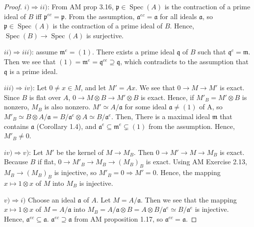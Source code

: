 \documentclass[12pt,letterpaper]{article}
\theoremstyle{definition}
\theoremstyle{remark}
\numberwithin{figure}{problem}
\numberwithin{equation}{section}
\DeclareMathOperator{\Spec}{Spec}
\begin{document}
\begin{proof}
  \par $i) \Rightarrow ii)$: From AM prop 3.16, $\mathfrak{p} \in \Spec(A)$ is the contraction of a prime ideal of $B$ iff $\mathfrak{p}^{ec} = \mathfrak{p}$. From the assumption, $\mathfrak{a}^{ec} = \mathfrak{a}$ for all ideals $\mathfrak{a}$, so $\mathfrak{p} \in \Spec(A)$ is the contraction of a prime ideal of $B$. Hence, $\Spec (B) \to \Spec(A)$ is surjective. 
  \par $ii) \Rightarrow iii)$: assume $\mathfrak{m}^e = (1)$. There exists a prime ideal $\mathfrak{q}$ of $B$ such that $\mathfrak{q}^c = \mathfrak{m}$. Then we see that $(1) = \mathfrak{m}^e = \mathfrak{q}^{ce} \supseteq \mathfrak{q}$, which contradicts to the assumption that $ \mathfrak{q}$ is a prime ideal. 
  \par $iii) \Rightarrow iv)$: Let $0 \neq x \in M$, and let $M' = Ax$. We see that $0 \to M \to M'$ is exact. Since $B$ is flat over $A$, $0 \to M \otimes B \to M' \otimes B$ is exact. Hence, if $M'_B = M' \otimes B$ is nonzero, $M_B$ is also nonzero. 
  $M' \simeq A/\mathfrak{a}$ for some ideal $\mathfrak{a} \neq (1)$ of A, so $M'_B \simeq B \otimes A/\mathfrak{a} = B/\mathfrak{a}^e \otimes A \simeq B/\mathfrak{a}^e$.
   Then, There is a maximal ideal $\mathfrak{m}$ that contains $\mathfrak{a}$ (Corollary 1.4), and $\mathfrak{a}^e \subseteq \mathfrak{m}^e \subsetneq (1)$ from the assumption. Hence, $M'_B \neq 0$. 
   \par $iv) \Rightarrow v)$: Let $M'$ be the kernel of $M \to M_B$. Then $0 \to M' \to M \to M_B $ is exact. Because $B$ if flat, $0 \to M'_B \to M_B \to (M_B)_B$ is exact. Using AM Exercise 2.13, $M_B \to (M_B)_B$ is injective, so $M'_B =0 \Rightarrow M' = 0$. Hence, the mapping $x \mapsto 1 \otimes x$ of $M$ into $M_B$ is injective. 
   \par $v) \Rightarrow i)$ Choose an ideal $\mathfrak{a}$ of $A$. Let $M = A/\mathfrak{a}$. Then we see that the mapping $x \mapsto 1 \otimes x$ of $M = A/\mathfrak{a}$ into $M_B = A/\mathfrak{a} \otimes B = A \otimes B/\mathfrak{a}^e \simeq B/\mathfrak{a}^e$ is injective. Hence, $\mathfrak{a}^{ec} \subseteq \mathfrak{a}$. $\mathfrak{a}^{ec} \supseteq \mathfrak{a}$ from AM proposition 1.17, so $\mathfrak{a}^{ec} = \mathfrak{a}$. 

\end{proof}
\end{document}
